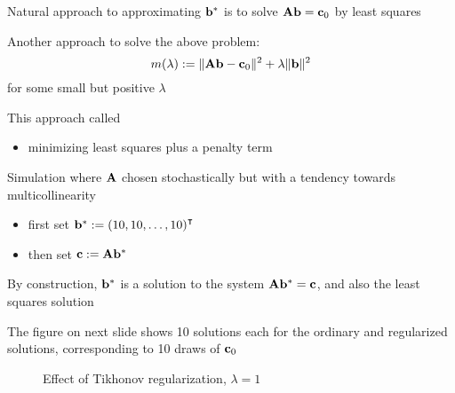 \begin{frame}

    \vspace{2em}
    Natural approach to approximating
    ${\mathbf b}^*$ is to solve $\mathbf A {\mathbf b} = {\mathbf c}_0$ by least squares
    
    Another approach to solve the above problem: 
    \begin{equation*}
        \label{eq:mla}
       m(\lambda) := \| \mathbf A {\mathbf b} - {\mathbf c}_0 \|^2 + \lambda \| {\mathbf b} \|^2  
    \end{equation*}
    for some small but positive $\lambda$
    
    \vspace{.7em}
    This approach called 
    \begin{itemize}
        \item minimizing least squares plus a
    penalty term
    \end{itemize}
    
\end{frame}

\begin{frame}

    \vspace{2em}
    Simulation where $\mathbf A$ chosen stochastically but with a
    tendency towards multicollinearity
    \begin{itemize}
        \item first set $\boldb^* := (10,10,\ldots,10)^\T$
        \item then set ${\mathbf c} := \mathbf A
    {\mathbf b}^*$
    \end{itemize}
    
    \vspace{.7em}
    By construction, ${\mathbf b}^*$ is a solution to the system
    $\mathbf A {\mathbf b}^* = {\mathbf c}$, and also the least squares solution
    
    The figure on next slide shows 10 solutions each for the ordinary
    and regularized solutions,
    corresponding to 10 draws of ${\mathbf c}_0$
    
\end{frame}

\begin{frame}

    \begin{figure}
       \begin{center}
        \caption{\label{f:tikreg} Effect of Tikhonov regularization, $\lambda=1$}
       \end{center}
    \end{figure}
    
\end{frame}


